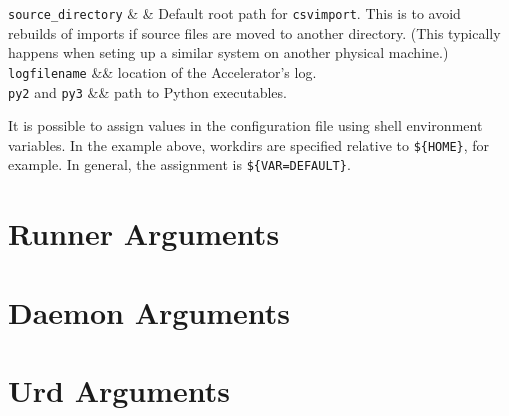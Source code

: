 \RP \texttt{source\_directory} & & Default root path for
\texttt{csvimport}.  This is to avoid rebuilds of imports if source
files are moved to another directory.  (This typically happens when
seting up a similar system on another physical machine.)\\

\RP \texttt{logfilename} && location of the Accelerator's log.\\

\RP \texttt{py2} and \texttt{py3} && path to Python executables.
\\

\stoptable
{}

It is possible to assign values in the configuration file using shell
environment variables.  In the example above, workdirs are specified
relative to \texttt{\$\{HOME\}}, for example.  In general, the
assignment is \texttt{\$\{VAR=DEFAULT\}}.

\section{Runner Arguments}

\section{Daemon Arguments}

\section{Urd Arguments}
